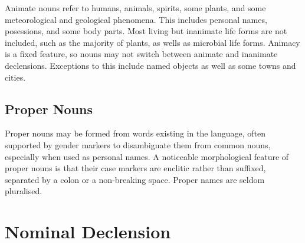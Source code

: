 \documentclass[grammar]{subfiles}
\begin{document}
	Animate nouns refer to humans, animals, spirits, some plants, and some meteorological and geological phenomena. This includes personal names, posessions, and some body parts. Most living but inanimate life forms are not included, such as the majority of plants, as wells as microbial life forms. Animacy is a fixed feature, so nouns may not switch between animate and inanimate declensions. Exceptions to this include named objects as well as some towns and cities.

	\subsection{Proper Nouns}
	\label{ssec:nm_proper_nouns}

	Proper nouns may be formed from words existing in the language\footnotemark{}, often supported by gender markers to disambiguate them from common nouns, especially when used as personal names. A noticeable morphological feature of proper nouns is that their case markers are enclitic rather than suffixed, separated by a colon or a non-breaking space. Proper names are seldom pluralised.






	\section{Nominal Declension}
	\label{sec:nm_declension}
\end{document}
